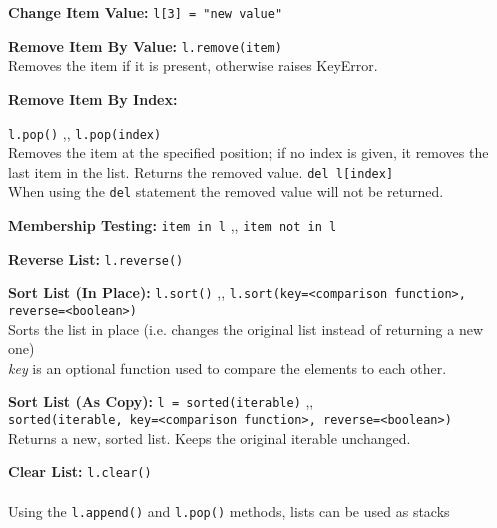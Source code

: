 \begin{indentblock}
            \textbf{Change Item Value:} \texttt{l[3] = "new value"}

            \textbf{Remove Item By Value:} \texttt{l.remove(item)} \\
        Removes the item if it is present, otherwise raises KeyError.

            \textbf{Remove Item By Index:}
        \begin{itemize}
             \texttt{l.pop()} \sep{,}
            \texttt{l.pop(index)} \\
            Removes the item at the specified position; if no index is given, it removes the last
            item in the list. Returns the removed value.
             \texttt{del l[index]} \\
            When using the \texttt{del} statement the removed value will not be
            returned.
        \end{itemize}


            \textbf{Membership Testing:} \texttt{item in l} \sep{,}
        \texttt{item not in l}

            \textbf{Reverse List:} \texttt{l.reverse()}

            \textbf{Sort List (In Place):} \texttt{l.sort()} \sep{,}
        \texttt{l.sort(key=<comparison function>, reverse=<boolean>)} \\
        Sorts the list in place (i.e. changes the original list instead of returning a new one)\\
        \textit{key} is an optional function used to compare the elements to each other.

            \textbf{Sort List (As Copy):} \texttt{l = sorted(iterable)} \sep{,} \\
        \texttt{sorted(iterable, key=<comparison function>, reverse=<boolean>)} \\
        Returns a new, sorted list. Keeps the original iterable unchanged.

            \textbf{Clear List:} \texttt{l.clear()}
        \\ \\
        Using the \texttt{l.append()} and \texttt{l.pop()} methods, lists
        can be used as stacks

        \end{indentblock}

